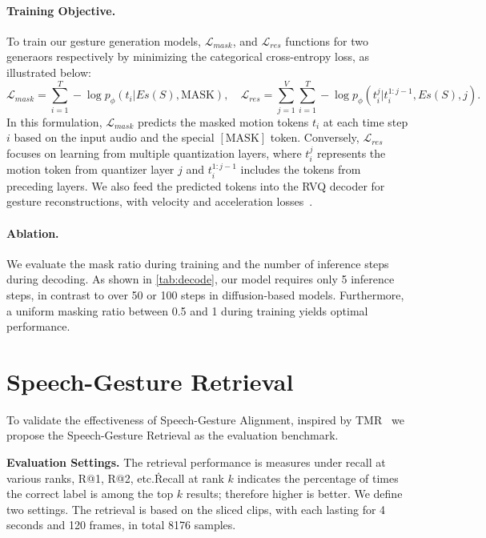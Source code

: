 \paragraph{Training Objective.}
To train our gesture generation models, $\mathcal{L}_{mask}$, and  $\mathcal{L}_{res}$ functions for two generaors respectively by minimizing the categorical cross-entropy loss, as illustrated below:
\begin{equation}
\mathcal{L}_{mask} = \sum_{i=1}^{T} -\log p_\phi(t_i | Es(S), \mathrm{MASK}), \quad \mathcal{L}_{res} = \sum_{j=1}^{V}\sum_{i=1}^{T}-\log p_\phi(t_i^j | t_i^{1:j-1}, Es(S), j).
\end{equation}
In this formulation, $\mathcal{L}_{mask}$ predicts the masked motion tokens $t_i$ at each time step $i$ based on the input audio and the special $[\mathrm{MASK}]$ token. Conversely, $\mathcal{L}_{res}$ focuses on learning from multiple quantization layers, where $t_i^j$ represents the motion token from quantizer layer $j$ and $t_i^{1:j-1}$ includes the tokens from preceding layers. We also feed the predicted tokens into the RVQ decoder for gesture reconstructions, with velocity and acceleration losses~\cite{mdm, siyao2022bailando}.

\vspace{-0.2cm}
\paragraph{Ablation.} We evaluate the mask ratio during training and the number of inference steps during decoding. As shown in \cref{tab:decode}, our model requires only 5 inference steps, in contrast to over 50 or 100 steps in diffusion-based models. Furthermore, a uniform masking ratio between 0.5 and 1 during training yields optimal performance. 





\section{Speech-Gesture Retrieval}
\label{sec:s2g-alignment}

To validate the effectiveness of Speech-Gesture Alignment, inspired by TMR~\cite{tmr} we propose the Speech-Gesture Retrieval as the evaluation benchmark.

\noindent\textbf{Evaluation Settings.}
The retrieval performance is measures under recall at various ranks, R@1, R@2, etc.\. Recall at rank $k$ indicates the percentage of times the correct label is among the top $k$ results; therefore higher is better. We define two settings. The retrieval is based on the sliced clips, with each lasting for 4 seconds and 120 frames, in total 8176 samples.

